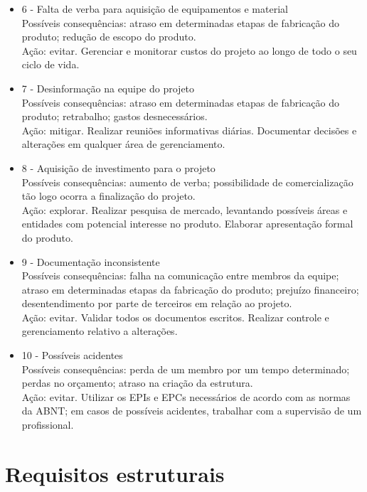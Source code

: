 \begin{itemize}
	\item 6 - Falta de verba para aquisição de equipamentos e material \\ 
	Possíveis consequências: atraso em determinadas etapas de fabricação do produto; redução de escopo do produto. \\
	Ação: evitar. Gerenciar e monitorar custos do projeto ao longo de todo o seu ciclo de vida.
	
	\item 7 - Desinformação na equipe do projeto \\
	Possíveis consequências: atraso em determinadas etapas de fabricação do produto; retrabalho; gastos desnecessários. \\
	Ação: mitigar. Realizar reuniões informativas diárias. Documentar decisões e alterações em qualquer área de gerenciamento.
	
	\item 8 - Aquisição de investimento para o projeto \\
	Possíveis consequências: aumento de verba; possibilidade de comercialização tão logo ocorra a finalização do projeto. \\
	Ação: explorar. Realizar pesquisa de mercado, levantando possíveis áreas e entidades com potencial interesse no produto. Elaborar apresentação formal do produto.
	
	\item 9 - Documentação inconsistente \\
	Possíveis consequências: falha na comunicação entre membros da equipe; atraso em determinadas etapas da fabricação do produto; prejuízo financeiro; desentendimento por parte de terceiros em relação ao projeto. \\
	Ação: evitar. Validar todos os documentos escritos. Realizar controle e gerenciamento relativo a alterações.
	
	\item 10 - Possíveis acidentes \\
	Possíveis consequências: perda de um membro por um tempo determinado; perdas no orçamento; atraso na criação da estrutura. \\
	Ação: evitar. Utilizar os EPIs e EPCs necessários de acordo com as normas da ABNT; em casos de possíveis acidentes, trabalhar com a supervisão de um profissional.
	
\end{itemize}


\section{Requisitos estruturais}

